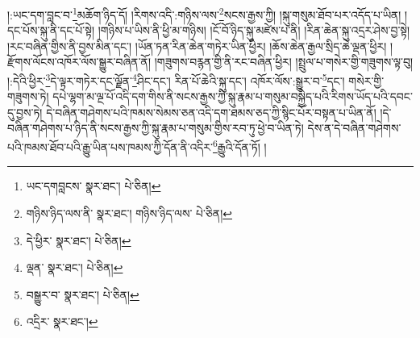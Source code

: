 །:ཡང་དག་བླང་བ་\footnote{ཡང་དགབླངས་  སྣར་ཐང་།  པེ་ཅིན། }མཆོག་ཉིད་དོ། །རིགས་འདི་:གཉིས་ལས་\footnote{གཉིས་ཉིད་ལས་ནི་  སྣར་ཐང་། གཉིས་ཉིད་ལས་  པེ་ཅིན། }སངས་རྒྱས་ཀྱི། །སྐུ་གསུམ་ཐོབ་པར་འདོད་པ་ཡིན། །དང་པོས་སྐུ་ནི་དང་པོ་སྟེ། །གཉིས་པ་ཡིས་ནི་ཕྱི་མ་གཉིས། །ངོ་བོ་ཉིད་སྐུ་མཛེས་པ་ནི། །རིན་ཆེན་སྐུ་འདྲར་ཤེས་བྱ་སྟེ། །རང་བཞིན་གྱིས་ནི་བྱས་མིན་དང་། །ཡོན་ཏན་རིན་ཆེན་གཏེར་ཡིན་ཕྱིར། །ཆོས་ཆེན་རྒྱལ་སྲིད་ཆེ་ལྡན་ཕྱིར། །རྫོགས་ལོངས་འཁོར་ལོས་སྒྱུར་བཞིན་ནོ། །གཟུགས་བརྙན་གྱི་ནི་རང་བཞིན་ཕྱིར། །སྤྲུལ་པ་གསེར་གྱི་གཟུགས་ལྟ་བུ། །:དེའི་ཕྱིར་\footnote{དེ་ཕྱིར་  སྣར་ཐང་།  པེ་ཅིན། }དེ་ལྟར་གཏེར་དང་ལྗོན་\footnote{ལྡན་  སྣར་ཐང་།  པེ་ཅིན། }ཤིང་དང་། རིན་པོ་ཆེའི་སྐུ་དང་། འཁོར་ལོས་:སྒྱུར་བ་\footnote{བསྒྱུར་བ་  སྣར་ཐང་།  པེ་ཅིན། }དང་། གསེར་གྱི་གཟུགས་ཏེ། དཔེ་ལྷག་མ་ལྔ་པོ་འདི་དག་གིས་ནི་སངས་རྒྱས་ཀྱི་སྐུ་རྣམ་པ་གསུམ་བསྐྱེད་པའི་རིགས་ཡོད་པའི་དབང་དུ་བྱས་ཏེ། དེ་བཞིན་གཤེགས་པའི་ཁམས་སེམས་ཅན་འདི་དག་ཐམས་ཅད་ཀྱི་སྙིང་པོར་བསྟན་པ་ཡིན་ནོ། །དེ་བཞིན་གཤེགས་པ་ཉིད་ནི་སངས་རྒྱས་ཀྱི་སྐུ་རྣམ་པ་གསུམ་གྱིས་རབ་ཏུ་ཕྱེ་བ་ཡིན་ཏེ། དེས་ན་དེ་བཞིན་གཤེགས་པའི་ཁམས་ཐོབ་པའི་རྒྱུ་ཡིན་པས་ཁམས་ཀྱི་དོན་ནི་འདིར་\footnote{འདྲིར་  སྣར་ཐང་། }རྒྱུའི་དོན་ཏོ། །
